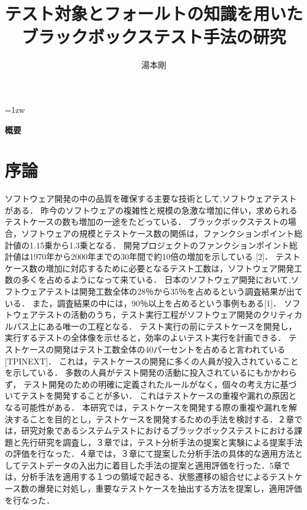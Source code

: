 \documentclass[a4paper,12pt]{jreport}
\title{テスト対象とフォールトの知識を用いたブラックボックステスト手法の研究}
\author{湯本剛}
\begin{document}
\maketitle
\thispagestyle{empty}
\newpage

\thispagestyle{empty}
\vspace*{20pt plus 1fil}
\parindent=1zw
\noindent
\begin{center}
{\bf 概要}
\vspace{5mm}
\end{center}

\par
\vspace{0pt plus 1fil}
\newpage

\tableofcontents
\listoffigures
\listoftables

\pagebreak \setcounter{page}{1}

\chapter{序論}
ソフトウェア開発の中の品質を確保する主要な技術として,ソフトウェアテストがある．
昨今のソフトウェアの複雑性と規模の急激な増加に伴い，求められるテストケースの数も増加の一途をたどっている．
ブラックボックステストの場合，ソフトウェアの規模とテストケース数の関係は，ファンクションポイント総計値の1.15乗から1.3乗となる．
開発プロジェクトのファンクションポイント総計値は1970年から2000年までの30年間で約10倍の増加を示している [2]．
テストケース数の増加に対応するために必要となるテスト工数は，ソフトウェア開発工数の多くを占めるようになって来ている．
日本のソフトウェア開発において,ソフトウェアテストは開発工数全体の28％から35％を占めるという調査結果が出ている．
また，調査結果の中には，90％以上を占めるという事例もある[1]．
ソフトウェアテストの活動のうち，テスト実行工程がソフトウェア開発のクリティカルパス上にある唯一の工程となる．
テスト実行の前にテストケースを開発し，実行するテストの全体像を示せると，効率のよいテスト実行を計画できる．
テストケースの開発はテスト工数全体の40パーセントを占めると言われている[TPINEXT]．
これは，テストケースの開発に多くの人員が投入されていることを示している．
多数の人員がテスト開発の活動に投入されているにもかかわらず， テスト開発のための明確に定義されたルールがなく，個々の考え方に基づいてテストを開発することが多い．
これはテストケースの重複や漏れの原因となる可能性がある．
本研究では，テストケースを開発する際の重複や漏れを解決することを目的とし，テストケースを開発するための手法を検討する．２章では，研究対象であるシステムテストにおけるブラックボックステストにおける課題と先行研究を調査し，３章では，テスト分析手法の提案と実験による提案手法の評価を行なった．４章では，３章にて提案した分析手法の具体的な適用方法としてテストデータの入出力に着目した手法の提案と適用評価を行った．5章では，分析手法を適用する１つの領域で起きる、状態遷移の組合せによるテストケース数の爆発に対処し，重要なテストケースを抽出する方法を提案し，適用評価を行なった．
\end{document}
